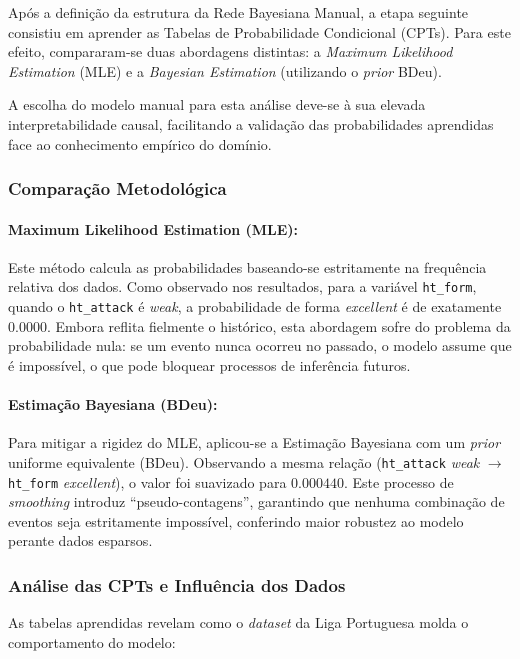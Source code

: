 \documentclass[10pt]{article}
\begin{document}
Após a definição da estrutura da Rede Bayesiana Manual, a etapa seguinte consistiu em aprender as Tabelas de Probabilidade Condicional (CPTs). Para este efeito, compararam-se duas abordagens distintas: a \textit{Maximum Likelihood Estimation} (MLE) e a \textit{Bayesian Estimation} (utilizando o \textit{prior} BDeu).

A escolha do modelo manual para esta análise deve-se à sua elevada interpretabilidade causal, facilitando a validação das probabilidades aprendidas face ao conhecimento empírico do domínio.

\subsubsection{Comparação Metodológica}

\paragraph{Maximum Likelihood Estimation (MLE):} 
Este método calcula as probabilidades baseando-se estritamente na frequência relativa dos dados. Como observado nos resultados, para a variável \texttt{ht\_form}, quando o \texttt{ht\_attack} é \textit{weak}, a probabilidade de forma \textit{excellent} é de exatamente $0.0000$. Embora reflita fielmente o histórico, esta abordagem sofre do problema da probabilidade nula: se um evento nunca ocorreu no passado, o modelo assume que é impossível, o que pode bloquear processos de inferência futuros.

\paragraph{Estimação Bayesiana (BDeu):}
Para mitigar a rigidez do MLE, aplicou-se a Estimação Bayesiana com um \textit{prior} uniforme equivalente (BDeu). Observando a mesma relação (\texttt{ht\_attack} \textit{weak} $\rightarrow$ \texttt{ht\_form} \textit{excellent}), o valor foi suavizado para $0.000440$. Este processo de \textit{smoothing} introduz ``pseudo-contagens'', garantindo que nenhuma combinação de eventos seja estritamente impossível, conferindo maior robustez ao modelo perante dados esparsos.

\subsubsection{Análise das CPTs e Influência dos Dados}

As tabelas aprendidas revelam como o \textit{dataset} da Liga Portuguesa molda o comportamento do modelo:
\end{document}
